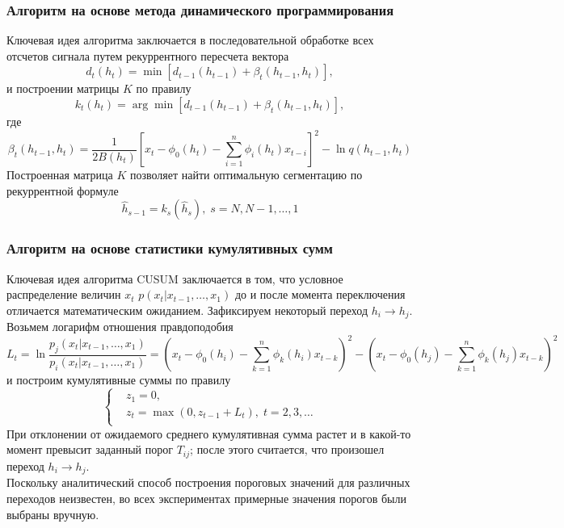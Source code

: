 \documentclass[9pt]{beamer}
\begin{document}
\begin{frame}\frametitle{Алгоритм на основе метода динамического программирования} 
Ключевая идея алгоритма заключается в последовательной обработке всех отсчетов сигнала путем рекуррентного пересчета вектора
$$d_t(h_t) = \min[d_{t-1}(h_{t-1})+\beta_t(h_{t-1},h_t)],$$ и построении матрицы $K$ по правилу
$$k_t(h_t) = \arg\min[d_{t-1}(h_{t-1})+\beta_t(h_{t-1},h_t)],$$
где
$$\beta_t(h_{t-1},h_t) = \frac{1}{2B(h_t)}[x_t-\phi_0(h_t)-\sum_{i=1}^{n}\phi_i(h_t)x_{t-i}]^2-\ln q(h_{t-1},h_t)$$
Построенная матрица $K$ позволяет найти оптимальную сегментацию по рекуррентной формуле
$$\hat{h}_{s-1} = k_s(\hat{h}_s),\; s = N, N-1, \dots, 1$$
\end{frame}

\begin{frame}\frametitle{Алгоритм на основе статистики кумулятивных сумм} 
Ключевая идея алгоритма CUSUM заключается в том, что условное распределение величин $x_t$ $p(x_t|x_{t-1},\dots,x_1)$ до и после момента переключения отличается математическим ожиданием. Зафиксируем некоторый переход $h_i \longrightarrow h_j$. Возьмем логарифм отношения правдоподобия
$$L_t = \ln \frac{p_j(x_t|x_{t-1},\dots,x_1)}{p_i(x_t|x_{t-1},\dots,x_1)} = (x_t - \phi_0(h_i) -\sum_{k=1}^{n} \phi_k(h_i) x_{t-k})^2 - (x_t - \phi_0(h_j) -\sum_{k=1}^{n} \phi_k(h_j) x_{t-k})^2$$
и построим кумулятивные суммы по правилу
\[
\left\{
\begin{aligned}
&z_1 = 0, \\
&z_t = \max(0, z_{t-1} + L_t), \;t = 2,3,\dots \\
\end{aligned}
\right.
\]
При отклонении от ожидаемого среднего кумулятивная сумма растет и в какой-то момент превысит заданный порог $T_{ij}$; после этого считается, что произошел переход $h_i \longrightarrow h_j$.\\
Поскольку аналитический способ построения пороговых значений для различных переходов неизвестен, во всех экспериментах примерные значения порогов были выбраны вручную.
\end{frame}
\end{document}
